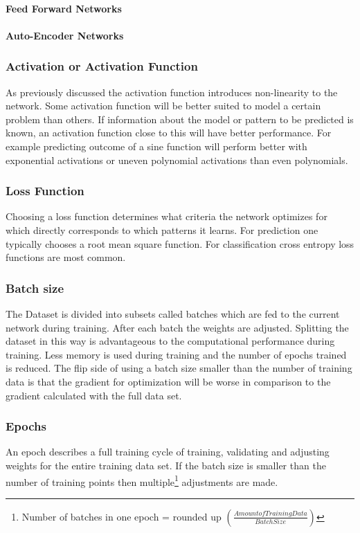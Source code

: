 				\paragraph{Feed Forward Networks}
				\paragraph{Auto-Encoder Networks}
			\subsubsection{Activation or Activation Function}
				As previously discussed the activation function introduces non-linearity to the network. Some activation function will be better suited to model a certain problem than others. If information about the model or pattern to be predicted is known, an activation function close to this will have better performance. For example predicting outcome of a sine function will perform better with exponential activations or uneven polynomial activations than even polynomials.%
			\subsubsection{Loss Function}
				Choosing a loss function determines what criteria the network optimizes for which directly corresponds to which patterns it learns. For prediction one typically chooses a root mean square function. For classification cross entropy loss functions are most common.
			\subsubsection{Batch size}
				The Dataset is divided into subsets called batches which are fed to the current network during training. After each batch the weights are adjusted. Splitting the dataset in this way is advantageous to the computational performance during training. Less memory is used during training and the number of epochs trained is reduced. The flip side of using a batch size smaller than the number of training data is that the gradient for optimization will be worse in comparison to the gradient calculated with the full data set. 
			\subsubsection{Epochs}
				An epoch describes a full training cycle of training, validating and adjusting weights for the entire training data set. If the batch size is smaller than the number of training points then multiple\footnote{Number of batches in one epoch = rounded up $\left(\frac{Amount of Training Data}{Batch Size}\right)$} adjustments are made.%
